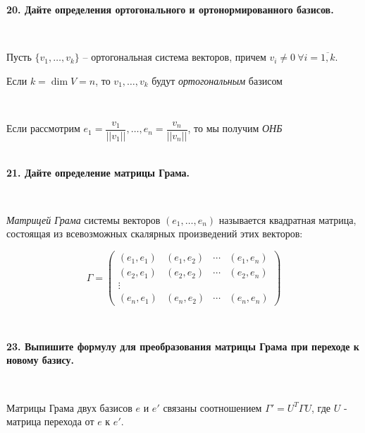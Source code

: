 \documentclass{article}
\begin{document}
    \textbf{20. Дайте определения ортогонального и ортонормированного базисов.}

    $\;$
        {
        \setlength{\parindent}{0.4cm}
        \hangindent=0.4cm

        Пусть $\{v_1, \ldots, v_k \}$ -- ортогональная система векторов, причем $v_i\ne0\ \forall i=\overline{1, k}$.

        Если $k=\dim V=n$, то $v_1, \ldots, v_k$ будут \textit{ортогональным} базисом

        $\;$

        Если рассмотрим $e_1=\dfrac{v_1}{||v_1||}, \ldots, e_n=\dfrac{v_n}{||v_n||}$, то мы получим \textit{ОНБ}\\

        $\;$
        \setlength{\parindent}{0cm}
        \hangindent=0cm
    }

    \newpage

    \textbf{21. Дайте определение матрицы Грама.}

    $\;$
        {
        \setlength{\parindent}{0.4cm}
        \hangindent=0.4cm

        \textit{Матрицей Грама} системы векторов $(e_1, \dots, e_n)$ называется квадратная матрица, состоящая из всевозможных скалярных произведений этих векторов:

        $$
        \Gamma =
        \begin{pmatrix}
        (e_1, e_1)
            & (e_1, e_2) & \dotsb & (e_1, e_n) \\
            (e_2, e_1) & (e_2, e_2) & \dotsb & (e_2, e_n) \\
            \vdots     &            &        & \\
            (e_n, e_1) & (e_n, e_2) & \dotsb & (e_n, e_n)
        \end{pmatrix}
        $$

        $\;$
        \setlength{\parindent}{0cm}
        \hangindent=0cm
    }

    \textbf{23. Выпишите формулу для преобразования матрицы Грама при переходе к новому базису.}

    $\;$
        {
        \setlength{\parindent}{0.4cm}
        \hangindent=0.4cm

        Матрицы Грама двух базисов $e$ и $e'$ связаны соотношением $\Gamma' = U^T \Gamma U $, где $U$ - матрица перехода от $e$ к $e'$.

        $\;$
        \setlength{\parindent}{0cm}
        \hangindent=0cm
    }
\end{document}
